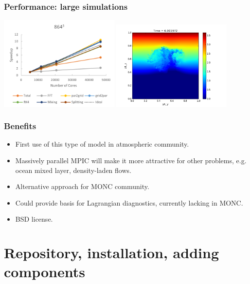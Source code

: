 \documentclass{beamer}
\def\gr#1{\color{dark_green} #1}
\def\re#1{\color{red}   #1}
\def\bl#1{\color{blue}  #1}
\def\pu#1{\color{purple} #1}
\begin{document}
\begin{frame}
\frametitle{Performance: large simulations}

\includegraphics[width=0.45\textwidth]{pmpic_images/864.png} 
\includegraphics[width=0.45\textwidth]{pmpic_images/6.png} 

\end{frame}


\begin{frame}
\frametitle{Benefits}

\begin{itemize}
\item First use of this type of model in atmospheric community.
\item Massively parallel MPIC will make it more attractive for {\pu other problems}, e.g. ocean mixed layer, density-laden flows.
\item {\bl Alternative approach} for MONC community.
\item Could provide basis for Lagrangian diagnostics, currently {\re lacking in MONC}.
\item {\gr BSD} license.
\end{itemize}

\end{frame}

\hypertarget{welcome-to-the-pmpic-wiki}{%
\section{Repository, installation, adding components}\label{welcome-to-the-pmpic-wiki}}
\end{document}

